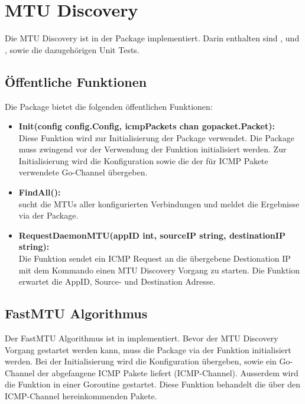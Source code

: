 \section{MTU Discovery}
\label{sec:MTU Discovery}

Die \ac{MTU} Discovery ist in der  Package implementiert. Darin enthalten sind ,  und , sowie die dazugehörigen Unit Tests.

\subsection{Öffentliche Funktionen}
Die  Package bietet die folgenden öffentlichen Funktionen:

\begin{itemize}
\item \textbf{Init(config config.Config, icmpPackets chan gopacket.Packet):} \\
Diese Funktion wird zur Initialisierung der  Package verwendet. Die Package muss zwingend vor der Verwendung der  Funktion initialisiert werden. Zur Initialisierung wird die Konfiguration sowie die der für \ac{ICMP} Pakete verwendete Go-Channel übergeben.
\item \textbf{FindAll():} \\
 sucht die \ac{MTU}s aller konfigurierten Verbindungen und meldet die Ergebnisse via der  Package.
\item \textbf{RequestDaemonMTU(appID int, sourceIP string, destinationIP string):} \\
Die Funktion  sendet ein ICMP Request an die übergebene Destionation IP mit dem Kommando einen \ac{MTU} Discovery Vorgang zu starten. Die Funktion erwartet die AppID, Source- und Destination Adresse.
\end{itemize}

\subsection{FastMTU Algorithmus}
Der FastMTU Algorithmus ist in  implementiert. Bevor der \ac{MTU} Discovery Vorgang gestartet werden kann, muss die  Package via der  Funktion initialisiert werden. Bei der Initialisierung wird die Konfiguration übergeben, sowie ein Go-Channel der abgefangene \ac{ICMP} Pakete liefert (ICMP-Channel). Ausserdem wird die Funktion  in einer Goroutine gestartet. Diese Funktion behandelt die über den ICMP-Channel hereinkommenden Pakete.


